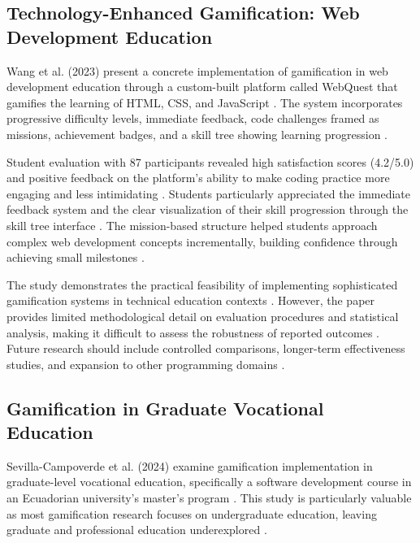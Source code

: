 \documentclass[12pt,a4paper]{article}
\begin{document}
\subsection{Technology-Enhanced Gamification: Web Development Education}

Wang et al. (2023) present a concrete implementation of gamification in web development education through a custom-built platform called WebQuest that gamifies the learning of HTML, CSS, and JavaScript \parencite{wang2023}. The system incorporates progressive difficulty levels, immediate feedback, code challenges framed as missions, achievement badges, and a skill tree showing learning progression \parencite{wang2023}.

Student evaluation with 87 participants revealed high satisfaction scores (4.2/5.0) and positive feedback on the platform's ability to make coding practice more engaging and less intimidating \parencite{wang2023}. Students particularly appreciated the immediate feedback system and the clear visualization of their skill progression through the skill tree interface \parencite{wang2023}. The mission-based structure helped students approach complex web development concepts incrementally, building confidence through achieving small milestones \parencite{wang2023}.

The study demonstrates the practical feasibility of implementing sophisticated gamification systems in technical education contexts \parencite{wang2023}. However, the paper provides limited methodological detail on evaluation procedures and statistical analysis, making it difficult to assess the robustness of reported outcomes \parencite{wang2023}. Future research should include controlled comparisons, longer-term effectiveness studies, and expansion to other programming domains \parencite{wang2023}.


\subsection{Gamification in Graduate Vocational Education}

Sevilla-Campoverde et al. (2024) examine gamification implementation in graduate-level vocational education, specifically a software development course in an Ecuadorian university's master's program \parencite{sevilla2024}. This study is particularly valuable as most gamification research focuses on undergraduate education, leaving graduate and professional education underexplored \parencite{sevilla2024}.
\end{document}
